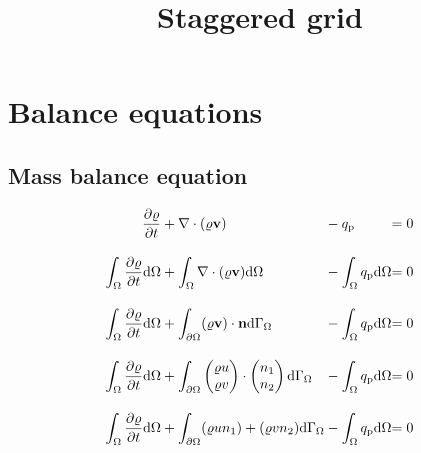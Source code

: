 \documentclass[a4paper,10pt]{scrartcl}
\title{Staggered grid}
\author{}
\begin{document}
\graphicspath{{./pictures/}}

\maketitle


\tableofcontents
\newpage

\section{Balance equations}
\subsection{Mass balance equation}
\begin{equation}
 \begin{alignedat}{3}
 \frac{\partial \varrho}{\partial t} &+ \nabla \cdot (\varrho \textbf{v}) &&- q_{\textup{p}} &= 0 \\[1em]
 \int_{\Omega} \frac{\partial \varrho}{\partial t} \text{d} \Omega &+ \int_{\Omega} \nabla \cdot (\varrho \textbf{v}) \text{d} \Omega &&- \int_{\Omega} q_{\textup{p}} \text{d} \Omega &= 0 \\[1em]
 \int_{\Omega} \frac{\partial \varrho}{\partial t} \text{d} \Omega &+ \int_{\partial \Omega} (\varrho \textbf{v}) \cdot \textbf{n} \text{d} \Gamma_{\Omega} &&- \int_{\Omega} q_{\textup{p}} \text{d} \Omega &= 0 \\[1em]
 \int_{\Omega} \frac{\partial \varrho}{\partial t} \text{d} \Omega &+ \int_{\partial \Omega} \begin{pmatrix}\varrho u \\ \varrho v\end{pmatrix} \cdot \begin{pmatrix}n_1 \\ n_2\end{pmatrix} \text{d} \Gamma_{\Omega} 
   &&- \int_{\Omega} q_{\textup{p}} \text{d} \Omega &= 0 \\[1em]
 \int_{\Omega} \frac{\partial \varrho}{\partial t} \text{d} \Omega &+ \int_{\partial \Omega} (\varrho u n_1) + (\varrho v n_2) \text{d} \Gamma_{\Omega} 
   &&- \int_{\Omega} q_{\textup{p}} \text{d} \Omega &= 0
\end{alignedat}
\end{equation}
\end{document}
